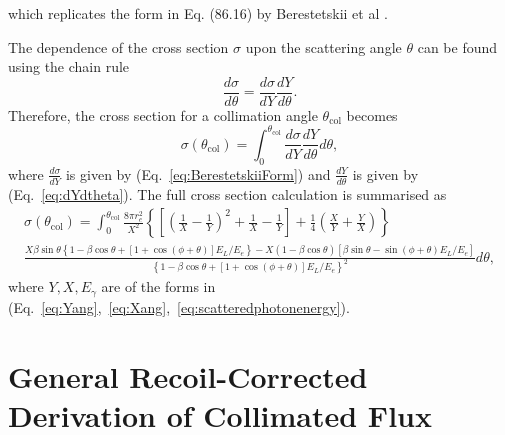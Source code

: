 \documentclass[10pt]{article}
\begin{document}
which replicates the form in Eq. (86.16) by Berestetskii et al \cite{berestetskii1982quantum}.

The dependence of the cross section $\sigma$ upon the scattering angle $\theta$ can be found using the chain rule
\begin{equation}
\frac{d\sigma}{d\theta} = \frac{d\sigma}{dY}\frac{dY}{d\theta}.
\label{eq:chainrule}
\end{equation}
Therefore, the cross section for a collimation angle $\theta_{\mathrm{col}}$ becomes
\begin{equation}
\sigma\left(\theta_{\mathrm{col}}\right) = \int_{0}^{\theta_{\mathrm{col}}}\frac{d\sigma}{dY}\frac{dY}{d\theta}d\theta,
\label{eq:crosssectionintegral}
\end{equation} 
where $\frac{d\sigma}{dY}$ is given by (Eq.~\ref{eq:BerestetskiiForm}) and $\frac{dY}{d\theta}$ is given by (Eq.~\ref{eq:dYdtheta}). The full cross section calculation is summarised as
\begin{multline}
\sigma\left(\theta_{\mathrm{col}}\right) = \int_{0}^{\theta_{\mathrm{col}}} \frac{8\pi r_{e}^{2}}{X^{2}}\left\{\left[\left(\frac{1}{X}-\frac{1}{Y}\right)^{2}+\frac{1}{X}-\frac{1}{Y}\right]+\frac{1}{4}\left(\frac{X}{Y}+\frac{Y}{X}\right)\right\}\\\frac{X\beta\sin\theta\left\{1-\beta\cos\theta+\left[1+\cos\left(\phi+\theta\right)\right]E_{L}/E_{e}\right\}-X\left(1-\beta\cos\theta\right)\left[\beta\sin\theta-\sin\left(\phi+\theta\right)E_{L}/E_{e}\right]}{\left\{1-\beta\cos\theta+\left[1+\cos\left(\phi+\theta\right)\right]E_{L}/E_{e}\right\}^{2}}d\theta,
\label{eq:fullcrosssectionintegral}
\end{multline}
where $Y, X, E_{\gamma}$ are of the forms in (Eq.~\ref{eq:Yang},~\ref{eq:Xang},~\ref{eq:scatteredphotonenergy}).

\section{General Recoil-Corrected Derivation of Collimated Flux}
\end{document}
